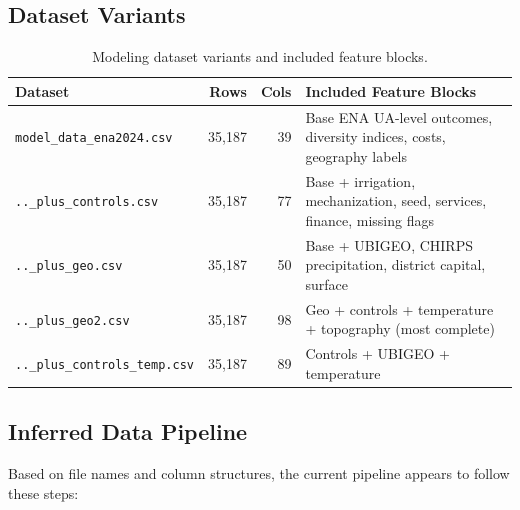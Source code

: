 \documentclass[11pt,a4paper]{article}
\begin{document}
\subsection{Dataset Variants}

\begin{table}[htbp]
\centering
\caption{Modeling dataset variants and included feature blocks.}
\label{tab:variants}
\small
\begin{tabular}{L{4cm}rrL{6cm}}
\toprule
\textbf{Dataset} & \textbf{Rows} & \textbf{Cols} & \textbf{Included Feature Blocks} \\
\midrule
\texttt{model\_data\_ena2024.csv} & 35,187 & 39 & Base ENA UA-level outcomes, diversity indices, costs, geography labels \\
\texttt{..\_plus\_controls.csv} & 35,187 & 77 & Base + irrigation, mechanization, seed, services, finance, missing flags \\
\texttt{..\_plus\_geo.csv} & 35,187 & 50 & Base + UBIGEO, CHIRPS precipitation, district capital, surface \\
\texttt{..\_plus\_geo2.csv} & 35,187 & 98 & Geo + controls + temperature + topography (most complete) \\
\texttt{..\_plus\_controls\_temp.csv} & 35,187 & 89 & Controls + UBIGEO + temperature \\
\bottomrule
\end{tabular}
\end{table}

\subsection{Inferred Data Pipeline}

Based on file names and column structures, the current pipeline appears to follow these steps:
\end{document}
